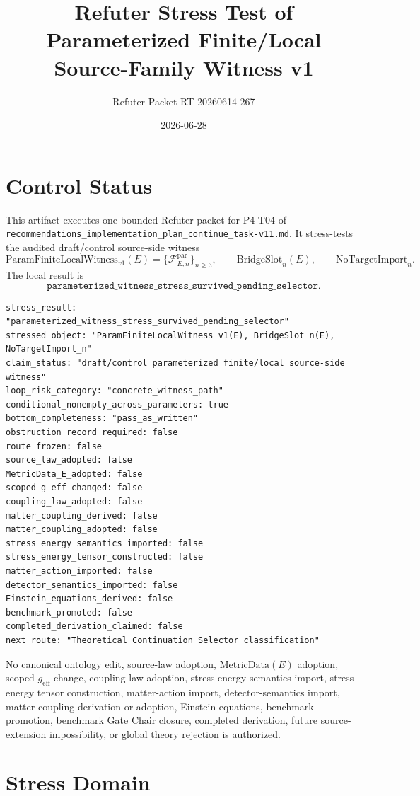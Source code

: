 \documentclass[11pt]{article}
\title{Refuter Stress Test of Parameterized Finite/Local Source-Family Witness v1}
\author{Refuter Packet RT-20260614-267}
\date{2026-06-28}
\newcommand{\MetricData}{\mathrm{MetricData}}
\newcommand{\geff}{g_{\mathrm{eff}}}
\newcommand{\PFLFW}{\mathrm{ParamFiniteLocalWitness}_{v1}}
\newcommand{\BridgeSlot}{\mathrm{BridgeSlot}}
\newcommand{\NoTargetImport}{\mathrm{NoTargetImport}}
\begin{document}
\maketitle

\section{Control Status}

This artifact executes one bounded Refuter packet for P4-T04 of
\texttt{recommendations\_implementation\_plan\_continue\_task-v11.md}. It
stress-tests the audited draft/control source-side witness
\[
  \PFLFW(E)=\{\mathcal{F}^{\mathrm{par}}_{E,n}\}_{n\ge 3},
  \qquad
  \BridgeSlot_n(E),
  \qquad
  \NoTargetImport_n.
\]
The local result is
\[
  \texttt{parameterized\_witness\_stress\_survived\_pending\_selector}.
\]

\begin{verbatim}
stress_result: "parameterized_witness_stress_survived_pending_selector"
stressed_object: "ParamFiniteLocalWitness_v1(E), BridgeSlot_n(E), NoTargetImport_n"
claim_status: "draft/control parameterized finite/local source-side witness"
loop_risk_category: "concrete_witness_path"
conditional_nonempty_across_parameters: true
bottom_completeness: "pass_as_written"
obstruction_record_required: false
route_frozen: false
source_law_adopted: false
MetricData_E_adopted: false
scoped_g_eff_changed: false
coupling_law_adopted: false
matter_coupling_derived: false
matter_coupling_adopted: false
stress_energy_semantics_imported: false
stress_energy_tensor_constructed: false
matter_action_imported: false
detector_semantics_imported: false
Einstein_equations_derived: false
benchmark_promoted: false
completed_derivation_claimed: false
next_route: "Theoretical Continuation Selector classification"
\end{verbatim}

No canonical ontology edit, source-law adoption, \(\MetricData(E)\) adoption,
scoped-\(\geff\) change, coupling-law adoption, stress-energy semantics import,
stress-energy tensor construction, matter-action import, detector-semantics
import, matter-coupling derivation or adoption, Einstein equations, benchmark
promotion, benchmark Gate Chair closure, completed derivation, future
source-extension impossibility, or global theory rejection is authorized.

\section{Stress Domain}
\end{document}
